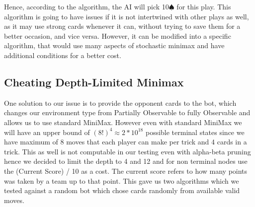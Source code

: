 Hence, according to the algorithm, the AI will pick 10$\spadesuit$ for this play. This algorithm is going to
have issues if it is not intertwined with other plays as well, as it may use strong cards whenever it can, without trying to
save them for a better occasion, and vice versa. However, it can be modified into a specific algorithm, that would
use many aspects of stochastic minimax and have additional conditions for a better cost.

\subsection{Cheating Depth-Limited Minimax}
One solution to our issue is to provide the opponent cards to the bot, which changes our environment type from Partially Observable to fully Observable and allows us to use standard MiniMax.
However even with standard MiniMax we will have an upper bound of $(8!)^4 \approx 2*10^{18}$ possible terminal states since we have maximum of 8 moves that each player can make per trick and 4 cards in a trick.
This as well is not computable in our testing even with alpha-beta pruning hence we decided to limit the depth to 4 and 12 and for non terminal nodes use the (Current Score) / 10 as a cost.
The current score refers to how many points was taken by a team up to that point. This gave us two algorithms which we tested against a random bot which chose cards randomly from available valid moves.
